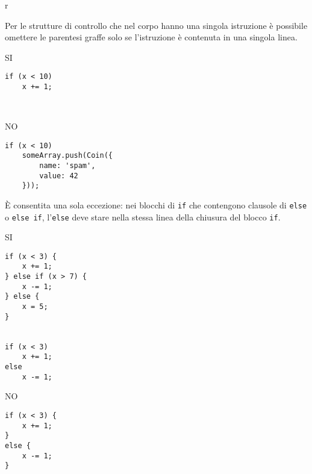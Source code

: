 r\documentclass[../ProcessiPrimari.tex]{subfiles}
\begin{document}
Per le strutture di controllo che nel corpo hanno una singola istruzione è possibile omettere le parentesi graffe solo se l'istruzione è contenuta in una singola linea.
\begin{center}{
\begin{minipage}{6cm}
{\begin{center}SI\end{center}}
\begin{Verbatim}[frame=single]
if (x < 10)
    x += 1;



\end{Verbatim}
\end{minipage}
\hfil
\begin{minipage}{6cm}
{\begin{center}NO\end{center}}
\begin{Verbatim}[frame=single]
if (x < 10)
    someArray.push(Coin({
        name: 'spam',
        value: 42
    }));
\end{Verbatim}
\end{minipage}
}
\end{center}
\`{E} consentita una sola eccezione: nei blocchi di \texttt{if} che contengono clausole di \texttt{else} o \texttt{else if}, l'\texttt{else} deve stare nella stessa linea della chiusura del blocco \texttt{if}.
\begin{center}{
\begin{minipage}{6cm}
{\begin{center}SI\end{center}}
\begin{Verbatim}[frame=single]
if (x < 3) {
    x += 1;
} else if (x > 7) {
    x -= 1;
} else {
    x = 5;
}


if (x < 3)
    x += 1;
else
    x -= 1;
\end{Verbatim}
\end{minipage}
\hfil
\begin{minipage}{6cm}
{\begin{center}NO\end{center}}
\begin{Verbatim}[frame=single]
if (x < 3) {
    x += 1;
}
else {
    x -= 1;
}







\end{Verbatim}
\end{minipage}
}
\end{center}
\end{document}
